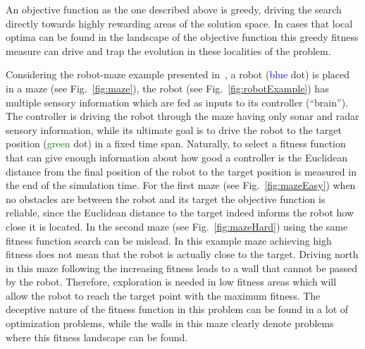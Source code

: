 An objective function as the one described above is greedy, driving the search directly towards highly rewarding areas of the solution space. In cases that local optima can be found in the landscape of the objective function this greedy fitness measure can drive and trap the evolution in these localities of the problem.

Considering the robot-maze example presented in~\citep{lehman2011abandoning,lehman2010revising}, a robot (\textcolor{Blue}{blue} dot) is placed in a maze (see Fig.~\ref{fig:maze}), the robot (see Fig.~\ref{fig:robotExample}) has multiple sensory information which are fed as inputs to its controller (``brain''). The controller is driving the robot through the maze having only sonar and radar sensory information, while its ultimate goal is to drive the robot to the target position (\textcolor{Green}{green} dot) in a fixed time span. Naturally, to select a fitness function that can give enough information about how good a controller is the Euclidean distance  from the final position of the robot to the target position is measured in the end of the simulation time. For the first maze (see Fig.~\ref{fig:mazeEasy}) when no obstacles are between the robot and its target the objective function is reliable, since the Euclidean distance to the target indeed informs the robot how close it is located. In the second maze (see Fig.~\ref{fig:mazeHard}) using the same fitness function search can be mislead. In this example maze achieving high fitness does not mean that the robot is actually close to the target. Driving north in this maze following the increasing fitness leads to a wall that cannot be passed by the robot. Therefore, exploration is needed in low fitness areas which will allow the robot to reach the target point with the maximum fitness. The deceptive nature of the fitness function in this problem can be found in a lot of optimization problems, while the walls in this maze clearly denote problems where this fitness landscape can be found. 

